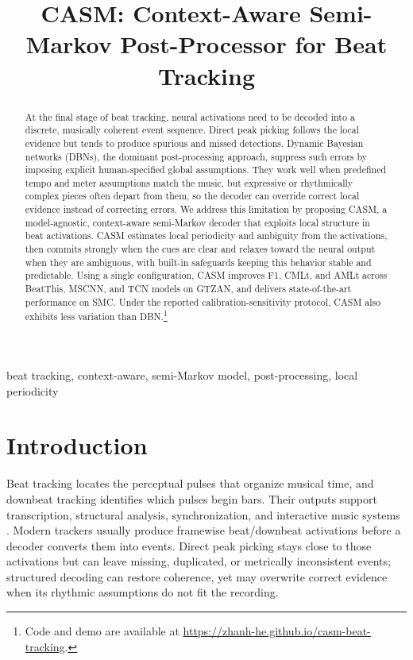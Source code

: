 \documentclass{article}
\title{CASM: Context-Aware Semi-Markov Post-Processor for Beat Tracking}
\begin{document}
\ninept
\maketitle

\begin{abstract}
At the final stage of beat tracking, neural activations need to be decoded into a discrete, musically coherent event sequence. Direct peak picking follows the local evidence but tends to produce spurious and missed detections. Dynamic Bayesian networks (DBNs), the dominant post-processing approach, suppress such errors by imposing explicit human-specified global assumptions. They work well when predefined tempo and meter assumptions match the music, but expressive or rhythmically complex pieces often depart from them, so the decoder can override correct local evidence instead of correcting errors. We address this limitation by proposing CASM, a model-agnostic, context-aware semi-Markov decoder that exploits local structure in beat activations. CASM estimates local periodicity and ambiguity from the activations, then commits strongly when the cues are clear and relaxes toward the neural output when they are ambiguous, with built-in safeguards keeping this behavior stable and predictable. Using a single configuration, CASM improves F1, CMLt, and AMLt across BeatThis, MSCNN, and TCN models on GTZAN, and delivers state-of-the-art performance on SMC. Under the reported calibration-sensitivity protocol, CASM also exhibits less variation than DBN.\footnote{Code and demo are available at \url{https://zhanh-he.github.io/casm-beat-tracking}.}
\end{abstract}

\begin{keywords}
beat tracking, context-aware, semi-Markov model, post-processing, local periodicity
\end{keywords}


\section{Introduction}
\label{sec:intro}
Beat tracking locates the perceptual pulses that organize musical time, and
downbeat tracking identifies which pulses begin bars. Their outputs support
transcription, structural analysis, synchronization, and interactive music
systems \cite{chiu2023localperiodicity,foscarin2024beat}. Modern trackers usually
produce framewise beat/downbeat activations before a decoder converts them into
events. Direct peak picking stays close to those activations but can leave
missing, duplicated, or metrically inconsistent events; structured decoding can
restore coherence, yet may overwrite correct evidence when its rhythmic
assumptions do not fit the recording.
\end{document}
